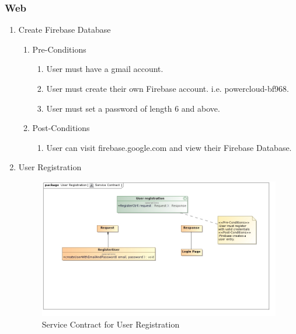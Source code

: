 \documentclass{article}
\begin{document}
	\subsubsection{Web}
	\begin{enumerate}
		\item	Create Firebase Database
		\begin{enumerate}
			\item  Pre-Conditions
			\begin{enumerate}
				\item	User must have a gmail account.
				\item	User must create their own Firebase account. i.e. powercloud-bf968.
				\item	User must set a password of length 6 and above.
			\end{enumerate}
			\item  Post-Conditions		
			\begin{enumerate}
				\item	User can visit firebase.google.com and view their Firebase Database.
			\end{enumerate}
		\end{enumerate}
		\item	User Registration
		
		\begin{figure}[H]
			\includegraphics[width=\textwidth]{images/RegisterServiceContract.jpg}
			\caption{Service Contract for User Registration \label{overflow}}
		\end{figure}
		

\end{enumerate}
\end{document}
